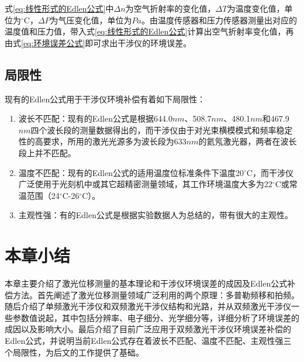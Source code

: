 式\eqref{eq:线性形式的Edlen公式}中\(\Delta n\)为空气折射率的变化值，\(\Delta T\)为温度变化值，单位为$^{\circ}$C，\(\Delta P\)为气压变化值，单位为\(Pa\)。由温度传感器和压力传感器测量出对应的温度值和压力值，带入式\eqref{eq:线性形式的Edlen公式}计算出空气折射率变化值，再由式\eqref{eq:环境误差公式}即可求出干涉仪的环境误差。
\subsection{局限性}
现有的Edlen公式用于干涉仪环境补偿有着如下局限性：
\begin{enumerate}
  \item 波长不匹配：现有的Edlen公式是根据644.0$nm$、508.7$nm$、480.1$nm$和467.9$nm$四个波长段的测量数据得出的\cite{2020Effect}，而干涉仪由于对光束横模模式和频率稳定性的高要求，所用的激光光源多为波长段为633$nm$的氦氖激光器，两者在波长段上并不匹配。
  \item 温度不匹配：现有的Edlen公式的适用温度位标准条件下温度20$^{\circ}$C\cite{2020Effect}，而干涉仪广泛使用于光刻机中或其它超精密测量领域，其工作环境温度大多为22$^{\circ}$C或常温范围（24$^{\circ}$C-26$^{\circ}$C）。
  \item 主观性强：有的Edlen公式是根据实验数据人为总结的，带有很大的主观性。
\end{enumerate}


\section{本章小结}
本章主要介绍了激光位移测量的基本理论和干涉仪环境误差的成因及Edlen公式补偿方法。首先阐述了激光位移测量领域广泛利用的两个原理：多普勒频移和拍频。随后介绍了单频激光干涉仪和双频激光干涉仪结构和光路，并从双频激光干涉仪一些参数值说起，其中包括分辨率、电子细分、光学细分等，详细分析了环境误差的成因以及影响大小。最后介绍了目前广泛应用于双频激光干涉仪环境误差补偿的Edlen公式，并说明当前Edlen公式存在着波长不匹配、温度不匹配、主观性强三个局限性，为后文的工作提供了基础。